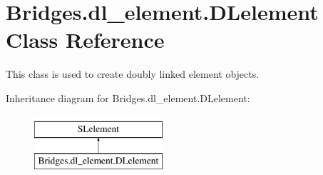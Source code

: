 \hypertarget{class_bridges_1_1dl__element_1_1_d_lelement}{}\section{Bridges.\+dl\+\_\+element.\+D\+Lelement Class Reference}
\label{class_bridges_1_1dl__element_1_1_d_lelement}


This class is used to create doubly linked element objects.  


Inheritance diagram for Bridges.\+dl\+\_\+element.\+D\+Lelement\+:\begin{figure}[H]
\begin{center}
\leavevmode
\includegraphics[height=2.000000cm]{class_bridges_1_1dl__element_1_1_d_lelement}
\end{center}
\end{figure}
